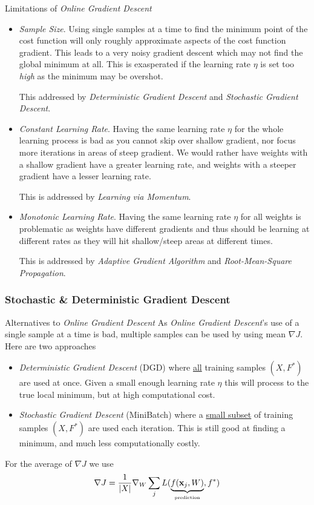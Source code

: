 \documentclass[11pt,a4paper]{article}
\begin{document}
  \begin{remark}{Limitations of \textit{Online Gradient Descent}}
    \begin{itemize}
      \item \textit{Sample Size}. Using single samples at a time to find the minimum point of the cost function will only roughly approximate aspects of the cost function gradient. This leads to a very noisy gradient descent which may not find the global minimum at all. This is exasperated if the learning rate $\eta$ is set too \textit{high} as the minimum may be overshot.
      \par This addressed by \textit{Deterministic Gradient Descent} and \textit{Stochastic Gradient Descent}.
      \item \textit{Constant Learning Rate}. Having the same learning rate $\eta$ for the whole learning process is bad as you cannot skip over shallow gradient, nor focus more iterations in areas of steep gradient. We would rather have weights with a shallow gradient have a greater learning rate, and weights with a steeper gradient have a lesser learning rate.
      \par This is addressed by \textit{Learning via Momentum}.
      \item \textit{Monotonic Learning Rate}. Having the same learning rate $\eta$ for all weights is problematic as weights have different gradients and thus should be learning at different rates as they will hit shallow/steep areas at different times.
      \par This is addressed by \textit{Adaptive Gradient Algorithm} and \textit{Root-Mean-Square Propagation}.
    \end{itemize}
  \end{remark}

\subsubsection{Stochastic \& Deterministic Gradient Descent}

  \begin{definition}{Alternatives to \textit{Online Gradient Descent}}
    As \textit{Online Gradient Descent}'s use of a single sample at a time is bad, multiple samples can be used by using mean $\nabla J$. Here are two approaches
    \begin{itemize}
      \item \textit{Deterministic Gradient Descent} (DGD) where \underline{all} training samples $(X,F^*)$ are used at once. Given a small enough learning rate $\eta$ this will process to the true local minimum, but at high computational cost.
      \item \textit{Stochastic Gradient Descent} (MiniBatch) where a \underline{small subset} of training samples $(X,F^*)$ are used each iteration. This is still good at finding a minimum, and much less computationally costly.
    \end{itemize}
    For the average of $\nabla J$ we use
    \[ \nabla J=\frac1{|X|}\nabla_W\sum_j L(\underbrace{f(\mathbf{x}_j,W)}_\text{\tiny prediction},f^*) \]
  \end{definition}
\end{document}
